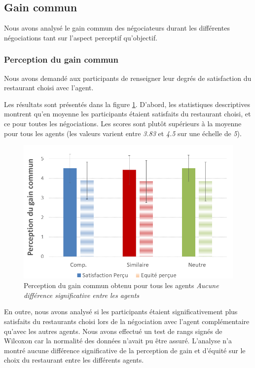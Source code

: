 	\subsection{Gain commun}
		Nous avons analysé le gain commun des négociateurs durant les différentes négociations tant sur l'aspect perceptif qu'objectif.
		
		\subsubsection{Perception du gain commun} Nous avons demandé aux participants de renseigner leur degrés de satisfaction du restaurant choisi avec l'agent.
		 
		Les résultats sont présentés dans la figure \ref{fig:gainCom}. D'abord, les statistiques descriptives montrent qu'en moyenne les participants étaient satisfaits du restaurant choisi, et ce pour toutes les négociations. Les scores sont plutôt supérieurs à la moyenne pour tous les agents (les valeurs varient entre \emph{3.83} et \emph{4.5} sur une échelle de \emph{5}). 
		
		\begin{figure}

		\centering
		\includegraphics[width= 0.65 \linewidth,clip=false]{Figures/chap7/percpGain.PNG}
		\caption{Perception du gain commun obtenu pour tous les agents \textit{Aucune différence significative entre les agents}}
		\label{fig:gainCom}
		\end{figure}
		
		En outre, nous avons analysé si les participants étaient significativement plus satisfaits du restaurants choisi lors de la négociation avec l'agent complémentaire qu'avec les autres agents. Nous avons effectué un test de rangs signés de Wilcoxon car la normalité des données n'avait pu être assuré. L'analyse n'a montré aucune différence significative de la perception de gain et d'équité sur le choix du restaurant entre les différents agents. 
		
